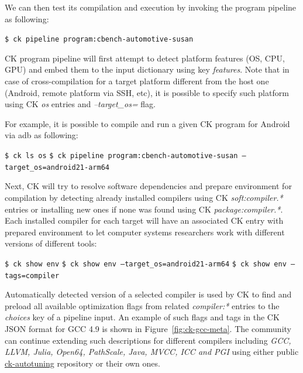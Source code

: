 We can then test its compilation and execution by invoking the program pipeline as following:
\begin{flushleft}
\texttt{\$ ck pipeline program:cbench-automotive-susan}\newline
\end{flushleft}

CK program pipeline will first attempt to detect platform features
(OS, CPU, GPU) and embed them to the input dictionary using key \textit{features}.
%
Note that in case of cross-compilation for a target platform different from the host one
(Android, remote platform via SSH, etc), 
it is possible to specify such platform using CK \textit{os} entries and \textit{--target\_os=} flag.

For example, it is possible to compile and run a given CK program for Android via adb as following:
\begin{flushleft}
\texttt{\$ ck ls os}\newline
\texttt{\$ ck pipeline program:cbench-automotive-susan --target\_os=android21-arm64}\newline
\end{flushleft}

Next, CK will try to resolve software dependencies and prepare environment for compilation
by detecting already installed compilers using CK \textit{soft:compiler.*} entries 
or installing new ones if none was found using CK \textit{package:compiler.*}.
%
Each installed compiler for each target 
will have an associated CK entry with prepared environment 
to let computer systems researchers work with different 
versions of different tools:
\begin{flushleft}
\texttt{\$ ck show env}\newline
\texttt{\$ ck show env --target\_os=android21-arm64}\newline
\texttt{\$ ck show env --tags=compiler}\newline
\end{flushleft}

Automatically detected version of a selected compiler is used by CK
to find and preload all available optimization flags 
from related \textit{compiler:*} entries to the \textit{choices} key
of a pipeline input.
%
An example of such flags and tags in the CK JSON format 
for GCC 4.9 is shown in Figure~\ref{fig:ck-gcc-meta}.
%
The community can continue extending such descriptions for different compilers
including \textit{GCC, LLVM, Julia, Open64, PathScale, Java, MVCC, ICC and PGI}
using either public \href{https://github.com/ctuning/ck-autotuning}{ck-autotuning} repository
or their own ones.

